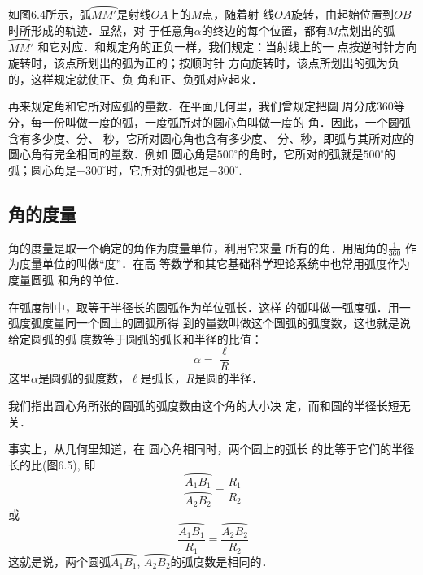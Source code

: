 如图6.4所示，弧$\wideparen{MM'}$是射线$OA$上的$M$点，随着射
线$OA$旋转，由起始位置到$OB$时所形成的轨迹．显然，对
于任意角$\alpha$的终边的每个位置，都有$M$点划出的弧$\wideparen{MM'}$
和它对应．和规定角的正负一样，我们规定：当射线上的一
点按逆时针方向旋转时，该点所划出的弧为正的；按顺时针
方向旋转时，该点所划出的弧为负的，这样规定就使正、负
角和正、负弧对应起来．

再来规定角和它所对应弧的量数．在平面几何里，我们曾规定把圆
周分成360等分，每一份叫做一度的弧，一度弧所对的圆心角叫做一度的
角．因此，一个圆弧含有多少度、分、
秒，它所对圆心角也含有多少度、
分、秒，即弧与其所对应的圆心角有完全相同的量数．例如
圆心角是$500^{\circ}$的角时，它所对的弧就是$500^{\circ}$的弧；圆心角是$-300^{\circ}$时，它所对的弧也是$-300^{\circ}$.

\subsection{角的度量}
角的度量是取一个确定的角作为度量单位，利用它来量
所有的角．用周角的$\frac{1}{360}$
作为度量单位的叫做“度”．在高
等数学和其它基础科学理论系统中也常用弧度作为度量圆弧
和角的单位．

在弧度制中，取等于半径长的圆弧作为单位弧长．这样
的弧叫做一弧度弧．用一弧度弧度量同一个圆上的圆弧所得
到的量数叫做这个圆弧的弧度数，这也就是说给定圆弧的弧
度数等于圆弧的弧长和半径的比值：
\begin{equation}
    \alpha=\frac{\ell}{R}
\end{equation}
这里$\alpha$是圆弧的弧度数，$\ell$是弧长，$R$是圆的半径．

我们指出圆心角所张的圆弧的弧度数由这个角的大小决
定，而和圆的半径长短无关．

事实上，从几何里知道，在
圆心角相同时，两个圆上的弧长
的比等于它们的半径长的比(图6.5), 即
\[\frac{\wideparen{A_1B_1}}{\wideparen{A_2B_2}}=\frac{R_1}{R_2}\]
或\[\frac{\wideparen{A_1B_1}}{R_1}=\frac{\wideparen{A_2B_2}}{R_2}\]
这就是说，两个圆弧$\wideparen{A_1B_1}$, $\wideparen{A_2B_2}$的弧度数是相同的．

\begin{figure}[htp]
    \centering
{}
    \caption{}
\end{figure}

